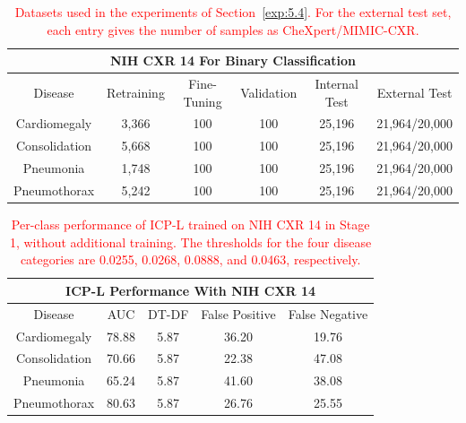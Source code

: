 \documentclass[preprint,7pt, a4paper]{elsarticle}
\begin{document}
\begin{table}
    \centering
    \begin{tabular}{c|ccccc}
        \toprule
        \multicolumn{6}{c}{\textbf{NIH CXR 14 For Binary Classification}}\\
        \midrule
        Disease & Retraining & Fine-Tuning & Validation & Internal Test & External Test \\
        \midrule
        Cardiomegaly & 3,366 & 100 & 100 & 25,196 & 21,964/20,000 \\
        Consolidation & 5,668 & 100 & 100 & 25,196 & 21,964/20,000 \\
        Pneumonia & 1,748 & 100 & 100 & 25,196 & 21,964/20,000 \\
        Pneumothorax & 5,242 & 100 & 100 & 25,196 & 21,964/20,000 \\
        \midrule
    \end{tabular}
    \caption{\textcolor{red}{Datasets used in the experiments of Section~\ref{exp:5.4}. For the external test set, each entry gives the number of samples as CheXpert/MIMIC-CXR.}}
    \label{tab:7}
\end{table}

\begin{table}
    \centering
    \begin{tabular}{c|cccc}
        \toprule
        \multicolumn{5}{c}{\textbf{ICP-L Performance With NIH CXR 14}}\\
        \midrule
        Disease & AUC & DT-DF & False Positive & False Negative \\
        \midrule
        Cardiomegaly & 78.88 & 5.87 & 36.20 & 19.76\\
        Consolidation & 70.66 & 5.87 & 22.38 & 47.08\\
        Pneumonia & 65.24 & 5.87 & 41.60 & 38.08\\
        Pneumothorax & 80.63 & 5.87 & 26.76 & 25.55\\
        \midrule
    \end{tabular}
    \caption{\textcolor{red}{Per-class performance of ICP-L trained on NIH CXR 14 in Stage 1, without additional training. The thresholds for the four disease categories are 0.0255, 0.0268, 0.0888, and 0.0463, respectively.}}
    \label{tab:8}
\end{table}
\end{document}
